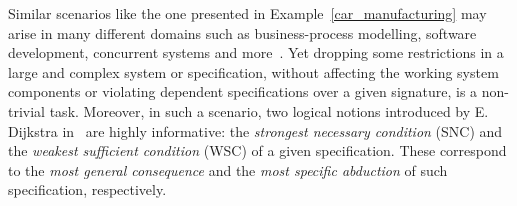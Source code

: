 \documentclass{article}
\begin{document}


Similar scenarios  like the one presented in Example~\ref{car_manufacturing} may arise in many different domains such as business-process modelling, software development, concurrent systems and more~\cite{Baier:PMC:2008}. Yet dropping some restrictions in a large and complex  system or specification, without affecting the working system components or violating dependent specifications over a given signature, is a non-trivial task.   Moreover, in such a scenario, two logical notions introduced by E. Dijkstra in~\cite{DBLP:journals/cacm/Dijkstra75} are highly informative: the \emph{strongest necessary condition} (SNC) and the \emph{weakest sufficient condition}  (WSC)  of a given specification. These correspond to the \emph{most general consequence} and the \emph{most specific abduction} of such specification, respectively.

\end{document}
